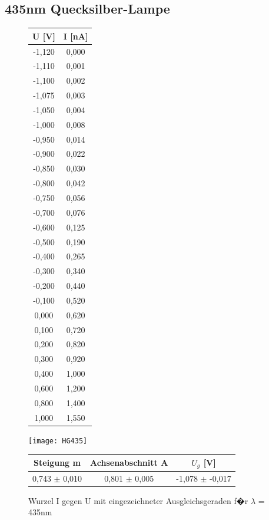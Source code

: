 \documentclass[a4paper, 10pt]{report}%
\begin{document}
\newpage
\subsection{435nm Quecksilber-Lampe}
\begin{figure}[!htbp]
\begin{minipage}[t]{2cm}
\vspace{0pt}
\centering
\begin{center}
\begin{tabular}{c|c}
U [V] & I [nA] \\
\hline
-1,120&	0,000 \\
-1,110&	0,001 \\
-1,100&	0,002 \\
-1,075&	0,003 \\
-1,050&	0,004 \\
-1,000&	0,008 \\
-0,950&	0,014 \\
-0,900&	0,022 \\
-0,850&	0,030 \\
-0,800&	0,042 \\
-0,750&	0,056 \\
-0,700&	0,076 \\
-0,600&	0,125 \\
-0,500&	0,190 \\
-0,400&	0,265 \\
-0,300&	0,340 \\
-0,200&	0,440 \\
-0,100&	0,520 \\
0,000 &	0,620 \\
0,100 &	0,720 \\
0,200 &	0,820 \\
0,300 &	0,920 \\
0,400 &	1,000 \\
0,600 &	1,200 \\
0,800 &	1,400 \\
1,000 &	1,550
\end{tabular}
\end{center}
\end{minipage}
\hfill
\begin{minipage}[t]{12cm}
\vspace{0pt}
\texttt{[image: HG435]}
\caption{Wurzel I gegen U mit eingezeichneter Ausgleichsgeraden f�r $\lambda$ = 435nm}
\begin{center}
\begin{tabular}{c|c|c}
Steigung m & Achsenabschnitt A & $U_g$ [V]\\
\hline
0,743 $\pm$ 0,010 & 0,801 $\pm$	0,005 & -1,078 $\pm$	-0,017
\end{tabular}
\end{center}
\end{minipage}
\end{figure}
\end{document}
